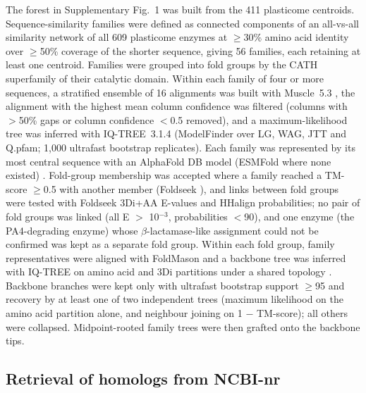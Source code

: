\documentclass[pdflatex,sn-nature,iicol]{sn-jnl}%
\begin{document}
The forest in Supplementary Fig.~1 was built from the 411 plasticome centroids. Sequence-similarity families were defined as connected components of an all-vs-all similarity network of all 609 plasticome enzymes at $\geq$30\% amino acid identity over $\geq$50\% coverage of the shorter sequence, giving 56 families, each retaining at least one centroid. Families were grouped into fold groups by the CATH superfamily of their catalytic domain. Within each family of four or more sequences, a stratified ensemble of 16 alignments was built with Muscle~5.3 \citep{edgar2022muscle5}, the alignment with the highest mean column confidence was filtered (columns with $>$50\% gaps or column confidence $<$0.5 removed), and a maximum-likelihood tree was inferred with IQ-TREE~3.1.4 \citep{minh2020iqtree2} (ModelFinder over LG, WAG, JTT and Q.pfam; 1,000 ultrafast bootstrap replicates). Each family was represented by its most central sequence with an AlphaFold DB model (ESMFold where none existed) \citep{varadi2022afdb,lin2023esm2}. Fold-group membership was accepted where a family reached a TM-score $\geq$0.5 with another member (Foldseek \citep{vankempen2024foldseek}), and links between fold groups were tested with Foldseek 3Di+AA E-values and HHalign \citep{steinegger2019hhsuite} probabilities; no pair of fold groups was linked (all E $>$ 10$^{-3}$, probabilities $<$90), and one enzyme (the PA4-degrading enzyme) whose $\beta$-lactamase-like assignment could not be confirmed was kept as a separate fold group. Within each fold group, family representatives were aligned with FoldMason \citep{gilchrist2026foldmason} and a backbone tree was inferred with IQ-TREE on amino acid and 3Di partitions under a shared topology \citep{puentelelievre2023threedi}. Backbone branches were kept only with ultrafast bootstrap support $\geq$95 and recovery by at least one of two independent trees (maximum likelihood on the amino acid partition alone, and neighbour joining on 1 $-$ TM-score); all others were collapsed. Midpoint-rooted family trees were then grafted onto the backbone tips.

\subsection{Retrieval of homologs from NCBI-nr}
\end{document}
